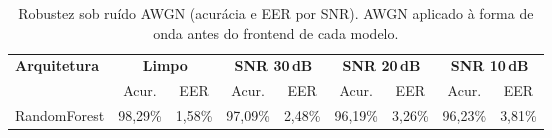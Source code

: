 \begin{table}[H]
\centering
\caption{Robustez sob ruído AWGN (acurácia e EER por SNR). AWGN aplicado à forma de onda antes do frontend de cada modelo.}
\label{tab:bench_robustez}
\small\singlespacing
\begin{tabular}{lcccccccc}
\toprule
\multirow{2}{*}{\textbf{Arquitetura}} & \multicolumn{2}{c}{\textbf{Limpo}} & \multicolumn{2}{c}{\textbf{SNR 30\,dB}} & \multicolumn{2}{c}{\textbf{SNR 20\,dB}} & \multicolumn{2}{c}{\textbf{SNR 10\,dB}} \\
\cmidrule(lr){2-3}\cmidrule(lr){4-5}\cmidrule(lr){6-7}\cmidrule(lr){8-9}
 & Acur. & EER & Acur. & EER & Acur. & EER & Acur. & EER \\
\midrule
RandomForest & 98,29\% & 1,58\% & 97,09\% & 2,48\% & 96,19\% & 3,26\% & 96,23\% & 3,81\% \\
\bottomrule
\end{tabular}
\end{table}
